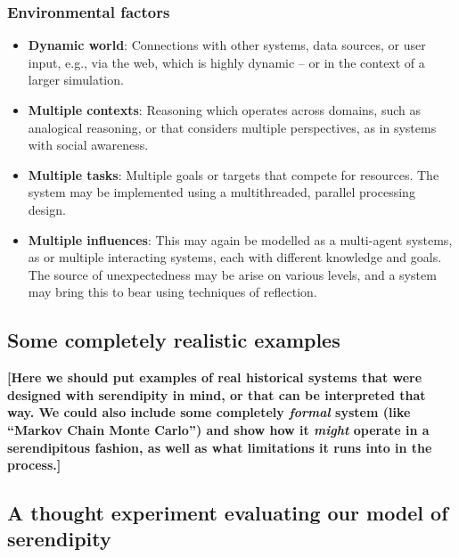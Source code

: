 \subsubsection*{Environmental factors}

\begin{itemize}
\item \textbf{Dynamic world}: Connections with other systems, data
  sources, or user input, e.g., via the web, which is highly dynamic --
  or in the context of a larger simulation.
\item \textbf{Multiple contexts}: Reasoning which operates across
  domains, such as analogical reasoning, or that considers multiple
  perspectives, as in systems with social awareness.
\item \textbf{Multiple tasks}: Multiple goals or targets that compete
  for resources.  The system may be implemented using a multithreaded,
  parallel processing design.
\item \textbf{Multiple influences}: This may again be modelled as a
  multi-agent systems, as or multiple interacting systems, each with
  different knowledge and goals.  The source of unexpectedness may be
  arise on various levels, and a system may bring this to bear using
  techniques of reflection.
\end{itemize}

% 

\subsection{Some completely realistic examples}

\textbf{[Here we should put examples of real historical systems that
    were designed with serendipity in mind, or that can be interpreted
    that way.  We could also include some completely \emph{formal}
    system (like ``Markov Chain Monte Carlo'') and show how it
    \emph{might} operate in a serendipitous fashion, as well as what
    limitations it runs into in the process.]}

\subsection{A thought experiment evaluating our model of serendipity} \label{sec:ww}


